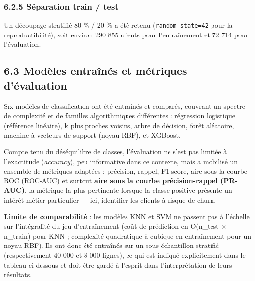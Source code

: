 \documentclass[11pt,a4paper]{article}
\begin{document}
\hypertarget{suxe9paration-train-test}{%
\subsubsection{6.2.5 Séparation train /
test}\label{suxe9paration-train-test}}

Un découpage stratifié 80 \% / 20 \% a été retenu
(\texttt{random\_\hspace{0pt}state=42} pour la reproductibilité), soit
environ 290 855 clients pour l'entraînement et 72 714 pour l'évaluation.

\hypertarget{moduxe8les-entrauxeenuxe9s-et-muxe9triques-duxe9valuation}{%
\subsection{6.3 Modèles entraînés et métriques
d'évaluation}\label{moduxe8les-entrauxeenuxe9s-et-muxe9triques-duxe9valuation}}

Six modèles de classification ont été entraînés et comparés, couvrant un
spectre de complexité et de familles algorithmiques différentes :
régression logistique (référence linéaire), k plus proches voisins,
arbre de décision, forêt aléatoire, machine à vecteurs de support (noyau
RBF), et XGBoost.

Compte tenu du déséquilibre de classes, l'évaluation ne s'est pas
limitée à l'exactitude (\emph{accuracy}), peu informative dans ce
contexte, mais a mobilisé un ensemble de métriques adaptées : précision,
rappel, F1-score, aire sous la courbe ROC (ROC-AUC) et surtout
\textbf{aire sous la courbe précision-rappel (PR-AUC)}, la métrique la
plus pertinente lorsque la classe positive présente un intérêt métier
particulier --- ici, identifier les clients à risque de churn.

\textbf{Limite de comparabilité} : les modèles KNN et SVM ne passent pas
à l'échelle sur l'intégralité du jeu d'entraînement (coût de prédiction
en O(n\_test × n\_train) pour KNN ; complexité quadratique à cubique en
entraînement pour un noyau RBF). Ils ont donc été entraînés sur un
sous-échantillon stratifié (respectivement 40 000 et 8 000 lignes), ce
qui est indiqué explicitement dans le tableau ci-dessous et doit être
gardé à l'esprit dans l'interprétation de leurs résultats.
\end{document}
